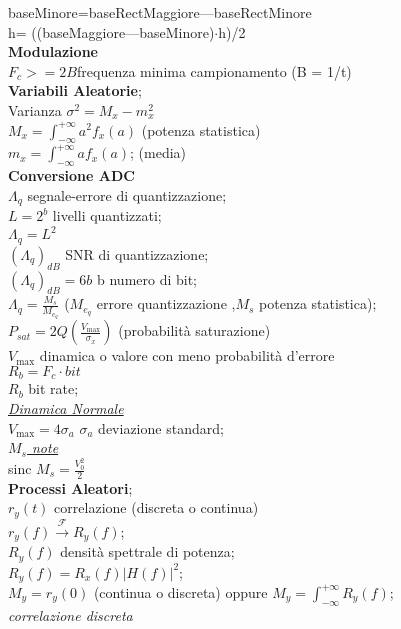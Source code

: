 \documentclass[a4paper]{article}
\begin{document}
\begin{multicols*}{3}
baseMinore=baseRectMaggiore---baseRectMinore\\
h= ((baseMaggiore---baseMinore)$\cdot$h)/2 \\
\textbf{Modulazione} \\
$F_c>=2B$frequenza minima campionamento (B = 1/t)\\
\textbf{Variabili Aleatorie}; \\
Varianza $\sigma^2=M_x-m_x^2$ \\
$M_x=\int_{-\infty}^{+\infty} a^2 f_x(a)$ (potenza statistica)\\
$m_x=\int_{-\infty}^{+\infty} a f_x(a)$; (media)\\
\textbf{Conversione ADC} \\
$\Lambda_q$ segnale-errore di quantizzazione; \\
$L=2^b$ livelli quantizzati; \\
$\Lambda_q = L^2$ \\
${(\Lambda_q)}_{dB}$ SNR di quantizzazione; \\
${(\Lambda_q)}_{dB} = 6b$ b numero di bit; \\
${\Lambda}_q=\frac{M_s}{M_{e_q}}$ ($M_{e_q}$ errore quantizzazione 
,$M_s$ potenza statistica); \\
$P_{sat}=2Q(\frac{V_{\max}}{\sigma_x})$ (probabilità saturazione) \\
$V_{\max}$ dinamica o valore con meno probabilità d'errore \\
$R_b=F_c \cdot bit$ \\
$R_b$ bit rate; \\
\underline{\textit{Dinamica Normale}} \\
$V_{\max} = 4\sigma_a$ $\sigma_a$ deviazione standard;\\ 
\underline{\textit{$M_s$ note}} \\
sinc $M_s = \frac{V_0^2}{2}$ \\
\textbf{Processi Aleatori}; \\
$r_y(t)$ correlazione (discreta o continua) \\
$r_y(f) \xrightarrow{\mathscr{F}} R_y(f)$; \\ 
$R_y(f)$ densità spettrale di potenza; \\
$R_y(f) = R_x(f) |H(f)|^2$; \\
$M_y = r_y(0)$ (continua o discreta) oppure 
$M_y = \int_{-\infty}^{+\infty} R_y(f)$;\\
\textit{correlazione discreta} \\

\end{multicols*}
\end{document}

